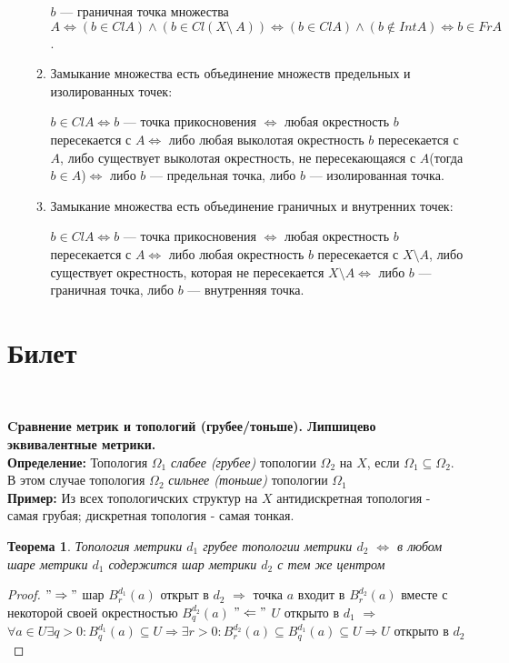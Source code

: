 \documentclass[a4paper,100pt]{article}
\theoremstyle{indented}
\newtheorem{theorem}{Теорема}
\begin{document}
\begin{itemize}
\begin{enumerate}
            $b$ --- граничная точка множества $A \iff (b \in ClA) \wedge (b \in Cl(X \setminus~ A)) \iff (b\in ClA) \wedge (b \notin IntA) \iff b \in FrA$.
        \item Замыкание множества есть объединение множеств предельных и изолированных точек:
        
        $b \in ClA \iff b$ --- точка прикосновения $\iff$ любая окрестность $b$ пересекается с $A \iff$ либо любая выколотая окрестность $b$ пересекается с $A$, либо существует выколотая окрестность, не пересекающаяся с $A$(тогда $b \in A$)$\iff$ либо $b$ --- предельная точка, либо $b$ --- изолированная точка.     
        \item Замыкание множества есть объединение граничных и внутренних точек:
        
        $b \in ClA \iff b$ --- точка прикосновения $\iff$ любая окрестность $b$ пересекается с $A \iff$ либо любая окрестность $b$ пересекается с $X \setminus A$, либо существует окрестность, которая не пересекается $X \setminus A \iff$ либо $b$ --- граничная точка, либо $b$ --- внутренняя точка.
    \end{enumerate}
\end{itemize}


\section{Билет} \

\medskip 

\textbf{Cравнение метрик и топологий (грубее/тоньше). Липшицево эквивалентные метрики.}\\

\textbf{Определение: } Топология $\Omega_1$ \textit{слабее (грубее)} топологии $\Omega_2$ на $X$, если $\Omega_1 \subseteq \Omega_2$. В этом случае топология $\Omega_2$ \textit{сильнее (тоньше)} топологии $\Omega_1$
\\

\textbf{Пример: } Из всех топологичских структур на $X$ антидискретная топология - самая грубая; дискретная топология - самая тонкая.
\\
\begin{theorem}
 Топология метрики $d_1$ грубее топологии метрики $d_2$ $\Longleftrightarrow$ в любом шаре метрики $d_1$ содержится шар метрики $d_2$ с тем же центром
\end{theorem}

\begin{proof} 
    $"\Rightarrow"$ шар $B_r^{d_1}(a)$ открыт в $d_2$ $\Rightarrow$ точка $a$ входит в $B_r^{d_2}(a)$ вместе с некоторой своей окрестностью $B_q^{d_2}(a)$ 
$"\Leftarrow"$ $U$ открыто в $d_1$ $\Rightarrow$ $\forall a \in U \exists q>0 : B_q^{d_1}(a) \subseteq U \Rightarrow \exists r > 0 : B_r^{d_2}(a) \subseteq B_q^{d_1}(a) \subseteq U \Rightarrow U$ открыто в $d_2$ 
\end{proof}
\end{document}
